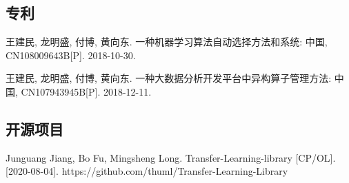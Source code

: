\begin{resume}
  


  \subsection*{专利}

  \begin{achievements}
    \item 王建民, 龙明盛, 付博, 黄向东. 一种机器学习算法自动选择方法和系统: 中国, CN108009643B[P]. 2018-10-30.
    \item 王建民, 龙明盛, 付博, 黄向东. 一种大数据分析开发平台中异构算子管理方法: 中国, CN107943945B[P]. 2018-12-11.
  \end{achievements}

  \subsection*{开源项目}
  \begin{achievements}
    \item Junguang Jiang, Bo Fu, Mingsheng Long. Transfer-Learning-library [CP/OL]. [2020-08-04]. https://github.com/thuml/Transfer-Learning-Library 
  \end{achievements}
  
\end{resume}
